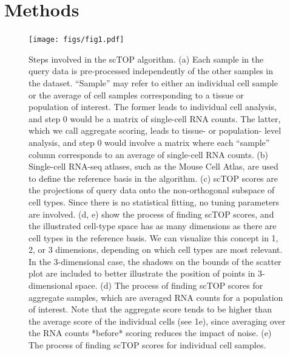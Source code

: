 \documentclass[aps,superscriptaddress, notitlepage,longbibliography]{revtex4-1}
\begin{document}
\section{Methods}
\begin{figure}
	\centering
		\texttt{[image: figs/fig1.pdf]}
	\caption{Steps involved in the scTOP algorithm. (a) Each sample in the query data is pre-processed independently of the other samples in the dataset. “Sample” may refer to either an individual cell sample or the average of cell samples corresponding to a tissue or population of interest. The former leads to individual cell analysis, and step 0 would be a matrix of single-cell RNA counts. The latter, which we call aggregate scoring, leads to tissue- or population- level analysis, and step 0 would involve a matrix where each “sample” column corresponds to an average of single-cell RNA counts. (b) Single-cell RNA-seq atlases, such as the Mouse Cell Atlas, are used to define the reference basis in the algorithm. (c) scTOP scores are the projections of query data onto the non-orthogonal subspace of cell types. Since there is no statistical fitting, no tuning parameters are involved. (d, e) show the process of finding scTOP scores, and the illustrated cell-type space has as many dimensions as there are cell types in the reference basis. We can visualize this concept in 1, 2, or 3 dimensions, depending on which cell types are most relevant. In the 3-dimensional case, the shadows on the bounds of the scatter plot are included to better illustrate the position of points in 3-dimensional space. (d) The process of finding scTOP scores for aggregate samples, which are averaged RNA counts for a population of interest. Note that the aggregate score tends to be higher than the average score of the individual cells (see 1e), since averaging over the RNA counts *before* scoring reduces the impact of noise. (e) The process of finding scTOP scores for individual cell samples.}
	\label{FIG:1}
\end{figure}
\end{document}
